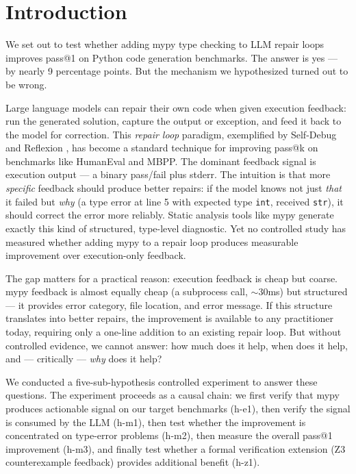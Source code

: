 \section{Introduction}

We set out to test whether adding mypy type checking to LLM repair loops
improves pass@1 on Python code generation benchmarks. The answer is yes ---
by nearly 9 percentage points. But the mechanism we hypothesized turned out
to be wrong.

Large language models can repair their own code when given execution feedback:
run the generated solution, capture the output or exception, and feed it back
to the model for correction. This \emph{repair loop} paradigm, exemplified by
Self-Debug \citep{Chen2023Teaching} and Reflexion \citep{Shinn2023Reflexion},
has become a standard technique for improving pass@k on benchmarks like
HumanEval and MBPP. The dominant feedback signal is execution output --- a
binary pass/fail plus stderr. The intuition is that more \emph{specific}
feedback should produce better repairs: if the model knows not just \emph{that}
it failed but \emph{why} (a type error at line 5 with expected type \texttt{int},
received \texttt{str}), it should correct the error more reliably. Static
analysis tools like mypy generate exactly this kind of structured, type-level
diagnostic. Yet no controlled study has measured whether adding mypy to a
repair loop produces measurable improvement over execution-only feedback.

The gap matters for a practical reason: execution feedback is cheap but
coarse. mypy feedback is almost equally cheap (a subprocess call, ${\sim}$30ms)
but structured --- it provides error category, file location, and error message.
If this structure translates into better repairs, the improvement is available
to any practitioner today, requiring only a one-line addition to an existing
repair loop. But without controlled evidence, we cannot answer: how much does
it help, when does it help, and --- critically --- \emph{why} does it help?

We conducted a five-sub-hypothesis controlled experiment to answer these
questions. The experiment proceeds as a causal chain: we first verify that
mypy produces actionable signal on our target benchmarks (h-e1), then verify
the signal is consumed by the LLM (h-m1), then test whether the improvement is
concentrated on type-error problems (h-m2), then measure the overall pass@1
improvement (h-m3), and finally test whether a formal verification extension
(Z3 counterexample feedback) provides additional benefit (h-z1).

